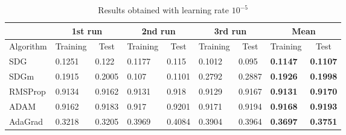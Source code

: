 \documentclass[12pt]{article}
\begin{document}
\begin{table}
\centering
\begin{tabular}{l|l|l|l|l|l|l|l|l|}
\cline{2-9}
 & \multicolumn{2}{c|}{1st run} & \multicolumn{2}{c|}{2nd run} & \multicolumn{2}{c|}{3rd run} & \multicolumn{2}{c|}{Mean} \\ \hline
\multicolumn{1}{|l|}{Algorithm} & \multicolumn{1}{c|}{Training} & \multicolumn{1}{c|}{Test} & \multicolumn{1}{c|}{Training} & \multicolumn{1}{c|}{Test} & \multicolumn{1}{c|}{Training} & \multicolumn{1}{c|}{Test} & \multicolumn{1}{c|}{Training} & \multicolumn{1}{c|}{Test} \\ \hline
\multicolumn{1}{|l|}{SDG} & 0.1251 & 0.122 & 0.1177 & 0.115 & 0.1012 & 0.095 & \textbf{0.1147} & \textbf{0.1107} \\ \cline{1-1}
\multicolumn{1}{|l|}{SDGm} & 0.1915 & 0.2005 & 0.107 & 0.1101 & 0.2792 & 0.2887 & \textbf{0.1926} & \textbf{0.1998} \\ \cline{1-1}
\multicolumn{1}{|l|}{RMSProp} & 0.9134 & 0.9162 & 0.9131 & 0.918 & 0.9129 & 0.9167 & \textbf{0.9131} & \textbf{0.9170} \\ \cline{1-1}
\multicolumn{1}{|l|}{ADAM} & 0.9162 & 0.9183 & 0.917 & 0.9201 & 0.9171 & 0.9194 & \textbf{0.9168} & \textbf{0.9193} \\ \cline{1-1}
\multicolumn{1}{|l|}{AdaGrad} & 0.3218 & 0.3205 & 0.3969 & 0.4084 & 0.3904 & 0.3964 & \textbf{0.3697} & \textbf{0.3751} \\ \hline
\end{tabular}
\caption{Results obtained with learning rate $10^{-5}$}
\label{tab:1e-5}
\end{table}
\end{document}
